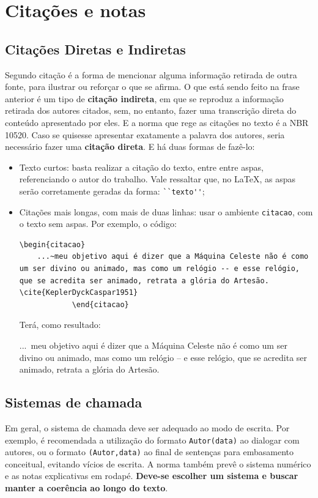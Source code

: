 \documentclass[
	12pt,				%
	openright,			%
	oneside,			%
	a4paper,			%
	english,			%
	brazil				%
	]{abntex2}
\begin{document}
\section{Citações e notas}

\subsection{Citações Diretas e Indiretas}
	Segundo \textcite{fuchs2025guia} citação é a forma de mencionar alguma informação retirada de outra fonte, para ilustrar ou reforçar o que se afirma. O que está sendo feito na frase anterior é um tipo de \textbf{citação indireta}, em que se reproduz a informação retirada dos autores citados, sem, no entanto, fazer uma transcrição direta do conteúdo apresentado por eles. E a norma que rege as citações no texto é a NBR 10520. Caso se quisesse apresentar exatamente a palavra dos autores, seria necessário fazer uma \textbf{citação direta}. E há duas formas de fazê-lo:

\begin{itemize}
		\item[a)] Texto curtos: basta realizar a citação do texto, entre entre aspas, referenciando o autor do trabalho. Vale ressaltar que, no \LaTeX, as aspas serão corretamente geradas da forma: \verb*|``texto''|;
		\item[b)] Citações mais longas, com mais de duas linhas: usar o ambiente \verb|citacao|, com	o texto sem aspas. Por exemplo, o código:
			
\begin{lstlisting}
\begin{citacao}	
	...~meu objetivo aqui é dizer que a Máquina Celeste não é como um ser divino ou animado, mas como um relógio -- e esse relógio, que se acredita ser animado, retrata a glória do Artesão. \cite{KeplerDyckCaspar1951}
			\end{citacao}	
\end{lstlisting}
\noindent Terá, como resultado:

\begin{citacao}	
		...~meu objetivo aqui é dizer que a Máquina Celeste não é como um ser divino ou animado, mas como um relógio -- e esse relógio, que se acredita ser animado, retrata a glória do Artesão. \cite{KeplerDyckCaspar1951}
\end{citacao}
\end{itemize}
	
\subsection{Sistemas de chamada}
	Em geral, o sistema de chamada deve ser adequado ao modo de escrita. Por exemplo, é recomendada a utilização do formato \verb*|Autor(data)| ao dialogar com autores, ou o formato \verb*|(Autor,data)| ao final de sentenças para embasamento conceitual, evitando vícios de escrita. A norma também prevê o sistema numérico e as notas explicativas em rodapé. \textbf{Deve-se escolher um sistema e buscar manter a coerência ao longo do texto}.
	
\end{document}
